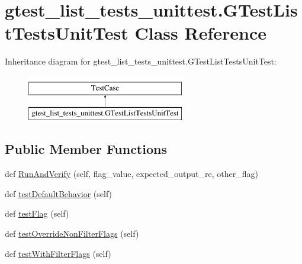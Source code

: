 \hypertarget{classgtest__list__tests__unittest_1_1_g_test_list_tests_unit_test}{}\section{gtest\+\_\+list\+\_\+tests\+\_\+unittest.\+G\+Test\+List\+Tests\+Unit\+Test Class Reference}
\label{classgtest__list__tests__unittest_1_1_g_test_list_tests_unit_test}
Inheritance diagram for gtest\+\_\+list\+\_\+tests\+\_\+unittest.\+G\+Test\+List\+Tests\+Unit\+Test\+:\begin{figure}[H]
\begin{center}
\leavevmode
\includegraphics[height=2.000000cm]{classgtest__list__tests__unittest_1_1_g_test_list_tests_unit_test}
\end{center}
\end{figure}
\subsection*{Public Member Functions}
\begin{DoxyCompactItemize}
\item 
def \mbox{\hyperlink{classgtest__list__tests__unittest_1_1_g_test_list_tests_unit_test_a965601cd1882fdeca94d2461bd033c40}{Run\+And\+Verify}} (self, flag\+\_\+value, expected\+\_\+output\+\_\+re, other\+\_\+flag)
\item 
def \mbox{\hyperlink{classgtest__list__tests__unittest_1_1_g_test_list_tests_unit_test_a4168d086b7ec31f86ab548b6fd79b27e}{test\+Default\+Behavior}} (self)
\item 
def \mbox{\hyperlink{classgtest__list__tests__unittest_1_1_g_test_list_tests_unit_test_a6d3e8738bd4b7494867cac464d342944}{test\+Flag}} (self)
\item 
def \mbox{\hyperlink{classgtest__list__tests__unittest_1_1_g_test_list_tests_unit_test_ae1ccba3f21c8e25968834607f7db2b10}{test\+Override\+Non\+Filter\+Flags}} (self)
\item 
def \mbox{\hyperlink{classgtest__list__tests__unittest_1_1_g_test_list_tests_unit_test_ac5bef6c9fb78b8eef84427de811fd70f}{test\+With\+Filter\+Flags}} (self)
\end{DoxyCompactItemize}


